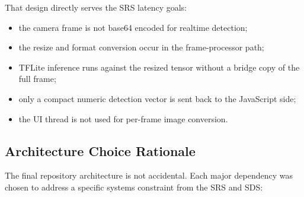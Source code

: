 \documentclass[conference]{IEEEtran}
\begin{document}
That design directly serves the SRS latency goals:
\begin{itemize}[leftmargin=1.2em]
\item the camera frame is not base64 encoded for realtime detection;
\item the resize and format conversion occur in the frame-processor path;
\item TFLite inference runs against the resized tensor without a bridge copy of the full frame;
\item only a compact numeric detection vector is sent back to the JavaScript side;
\item the UI thread is not used for per-frame image conversion.
\end{itemize}

\subsection{Architecture Choice Rationale}
The final repository architecture is not accidental. Each major dependency was chosen to address a specific systems constraint from the SRS and SDS:
\end{document}
